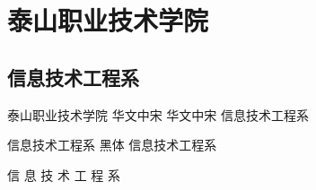 \documentclass[color=cyan,mathpazo,titlestyle=hang]{elegantbook}
\author{ddswhu \& LiamHuang0205}
\begin{document}
\maketitle
\tableofcontents
\mainmatter



\chapter{泰山职业技术学院}
\section{信息技术工程系}
{ 泰山职业技术学院}
{ 华文中宋 华文中宋}
信息技术工程系

{信息技术工程系}
黑体 信息技术工程系
\begin{note}

\hfill 信 息 技 术 工 程 系
\end{note}
\end{document}
